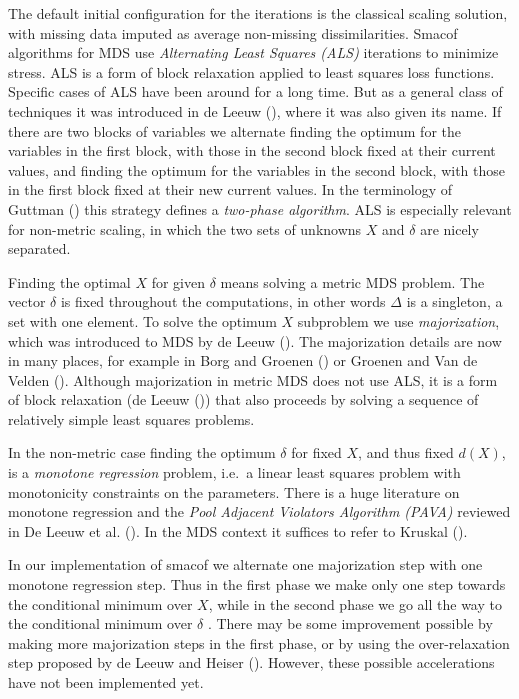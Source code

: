 \documentclass[
  12pt,
  letterpaper,
  DIV=11,
  numbers=noendperiod]{scrartcl}
\begin{document}
The default initial configuration for the iterations is the classical
scaling solution, with missing data imputed as average non-missing
dissimilarities. Smacof algorithms for MDS use \emph{Alternating Least
Squares (ALS)} iterations to minimize stress. ALS is a form of block
relaxation applied to least squares loss functions. Specific cases of
ALS have been around for a long time. But as a general class of
techniques it was introduced in {de Leeuw}
(), where it was also given its name.
If there are two blocks of variables we alternate finding the optimum
for the variables in the first block, with those in the second block
fixed at their current values, and finding the optimum for the variables
in the second block, with those in the first block fixed at their new
current values. In the terminology of Guttman
() this strategy defines a
\emph{two-phase algorithm}. ALS is especially relevant for non-metric
scaling, in which the two sets of unknowns \(X\) and \(\delta\) are
nicely separated.

Finding the optimal \(X\) for given \(\delta\) means solving a metric
MDS problem. The vector \(\delta\) is fixed throughout the computations,
in other words \(\Delta\) is a singleton, a set with one element. To
solve the optimum \(X\) subproblem we use \emph{majorization}, which was
introduced to MDS by {de Leeuw} (). The
majorization details are now in many places, for example in Borg and
Groenen () or Groenen and Van de
Velden (). Although
majorization in metric MDS does not use ALS, it is a form of block
relaxation ({de Leeuw} ()) that also
proceeds by solving a sequence of relatively simple least squares
problems.

In the non-metric case finding the optimum \(\delta\) for fixed \(X\),
and thus fixed \(d(X)\), is a \emph{monotone regression} problem, i.e.~a
linear least squares problem with monotonicity constraints on the
parameters. There is a huge literature on monotone regression and the
\emph{Pool Adjacent Violators Algorithm (PAVA)} reviewed in De Leeuw et
al. (). In the MDS context
it suffices to refer to Kruskal ().

In our implementation of smacof we alternate one majorization step with
one monotone regression step. Thus in the first phase we make only one
step towards the conditional minimum over \(X\), while in the second
phase we go all the way to the conditional minimum over \(\delta\) .
There may be some improvement possible by making more majorization steps
in the first phase, or by using the over-relaxation step proposed by {de
Leeuw and Heiser} (). However,
these possible accelerations have not been implemented yet.
\end{document}
